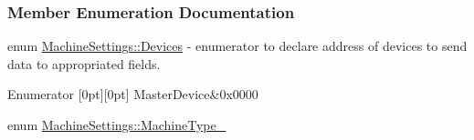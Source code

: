 \subsubsection{Member Enumeration Documentation}
\mbox{\label{classMachineSettings_ace5f0a84d32c0423bb62f068f102bf80}} 
{\footnotesize\ttfamily enum \mbox{\hyperlink{classMachineSettings_ace5f0a84d32c0423bb62f068f102bf80}{Machine\+Settings\+::\texorpdfstring{Devices}{Devices}}}} - enumerator to declare address of devices to send data to appropriated fields.

\begin{DoxyEnumFields}{Enumerator}
[0pt][0pt]{}\mbox{\label{classMachineSettings_ace5f0a84d32c0423bb62f068f102bf80aa0ef1af1f748dd75f12dd479a07ff628}} 
Master\+Device&0x0000\\
\hline

\end{DoxyEnumFields}
\mbox{\label{classMachineSettings_a0feee7a1964811bb4a602e9cc3bf459f}} 
{\footnotesize\ttfamily enum \mbox{\hyperlink{classMachineSettings_a0feee7a1964811bb4a602e9cc3bf459f}{Machine\+Settings\+::\texorpdfstring{Machine\+Type\+\_\+}{MachineType\_}}}}

